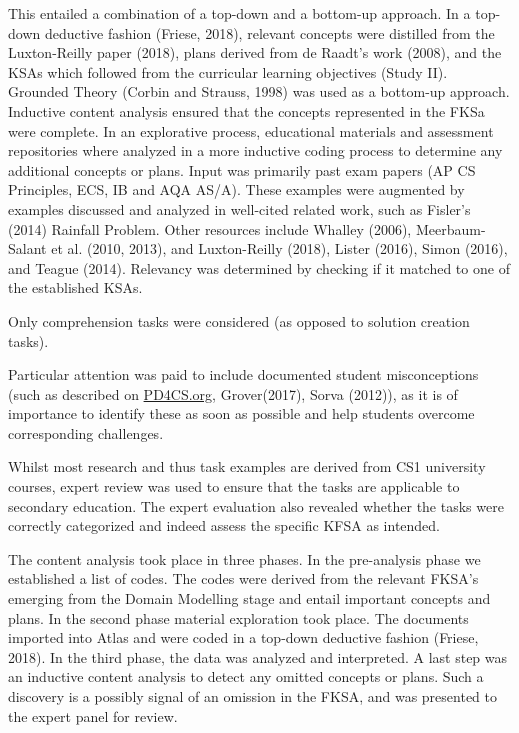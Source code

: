 This entailed a combination of a top-down and a bottom-up approach. In a top-down deductive fashion (Friese, 2018), relevant concepts were distilled from the Luxton-Reilly paper (2018), plans derived from de Raadt's work (2008), and the KSAs which followed from the curricular learning objectives (Study II). Grounded Theory (Corbin and Strauss, 1998) was used as a bottom-up approach. Inductive content analysis ensured that the concepts represented in the FKSa were complete. In an explorative process, educational materials and assessment repositories where analyzed in a more inductive coding process to determine any additional concepts or plans. Input was primarily past exam papers (AP CS Principles, ECS, IB and AQA AS/A). These examples were augmented by examples discussed and analyzed in well-cited related work, such as Fisler's (2014) Rainfall Problem. Other resources include Whalley (2006), Meerbaum-Salant et al. (2010, 2013), and Luxton-Reilly (2018), Lister (2016), Simon (2016), and Teague (2014). Relevancy was determined by checking if it matched to one of the established KSAs.%

Only comprehension tasks were considered (as opposed to solution creation tasks).

Particular attention was paid to include documented student misconceptions (such as described on \url{PD4CS.org}, Grover(2017), Sorva (2012)), as it is of importance to identify these as soon as possible and help students overcome corresponding challenges.

Whilst most research and thus task examples are derived from CS1 university courses, expert review was used to ensure that the tasks are applicable to secondary education. The expert evaluation also revealed whether the tasks were correctly categorized and indeed assess the specific KFSA as intended.


The content analysis took place in three phases. In the pre-analysis phase we established a list of codes. The codes were derived from the relevant FKSA's emerging from the Domain Modelling stage and entail important concepts and plans. In the second phase material exploration took place. The documents imported into Atlas and were coded in a top-down deductive fashion (Friese, 2018). In the third phase, the data was analyzed and interpreted. A last step was an inductive content analysis to detect any omitted concepts or plans. Such a discovery is a possibly signal of an omission in the FKSA, and was presented to the expert panel for review.


